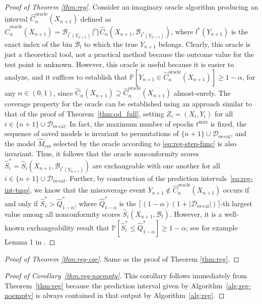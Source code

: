 \begin{proof}[Proof of Theorem \ref{thm:reg}]
Consider an imaginary oracle algorithm producing an interval $\hat{C}^{\text{oracle}}_{\alpha}(X_{n+1})$ defined as $\hat{C}^{\text{oracle}}_{\alpha}(X_{n+1}) = \mathcal{B}_{l^*(Y_{n+1})} \bigcap \hat{C}_{\alpha}(X_{n+1}, \mathcal{B}_{l^*(Y_{n+1})})$, where $l^*(Y_{n+1})$ is the exact index of the bin $\mathcal{B}_l$ to which the true $Y_{n+1}$ belongs. Clearly, this oracle is just a theoretical tool, not a practical method because the outcome value for the test point is unknown.
However, this oracle is useful because it is easier to analyze, and it suffices to establish that $\mathbb{P}[Y_{n+1} \in \hat{C}^{\text{oracle}}_{\alpha}(X_{n+1})] \geq 1-\alpha$, for any $\alpha \in (0,1)$, since $\hat{C}_{\alpha}(X_{n+1}) \supseteq \hat{C}^{\text{oracle}}_{\alpha}(X_{n+1})$ almost-surely.
The coverage property for the oracle can be established using an approach similar to that of the proof of Theorem~\ref{thm:od_full}, setting $Z_i=(X_i,Y_i)$ for all $i \in \{n+1\} \cup \mathcal{D}_{\text{es-cal}}$.
In fact, the maximum number of epochs $t^{\text{max}}$ is fixed, the sequence of saved models is invariant to permutations of $\{n+1\} \cup \mathcal{D}_{\text{es-cal}}$, and the  model $\hat{M}_{\text{ces}}$ selected by the oracle according to \eqref{eq:reg-step-func} is also invariant.
Thus, it follows that the oracle nonconformity scores $\hat{S}_i^* = \hat{S}_i(X_{n+1}, \mathcal{B}_{l^*(Y_{n+1})})$ are exchangeable with one another for all $i \in \{n+1\} \cup \mathcal{D}_{\text{es-cal}}$.
Further, by construction of the prediction intervals~\eqref{eq:reg-int-tmp}, we know that the miscoverage event $Y_{n+1} \not\in \hat{C}^{\text{oracle}}_{\alpha}(X_{n+1})$ occurs if and only if $\hat{S}^*_i > \hat{Q}^*_{1-\alpha}$, where $\hat{Q}^*_{1-\alpha}$ is the $\lceil (1-\alpha)(1+|\mathcal{D}_{\text{es-cal}}|) \rceil$-th largest value among all nonconformity scores $\hat{S}_i(X_{n+1},\mathcal{B}_l)$.
However, it is a well-known exchangeability result that $\mathbb{P}[\hat{S}^*_i \leq \hat{Q}^*_{1-\alpha}] \geq 1-\alpha$; see for example Lemma 1 in \citet{romano2019conformalized}.
\end{proof}


\begin{proof}[Proof of Theorem \ref{thm:reg-cqr}]
Same as the proof of Theorem \ref{thm:reg}.
\end{proof}

\begin{proof}[Proof of Corollary~\ref{thm:reg-noempty}]
This corollary follows immediately from Theorem~\ref{thm:reg} because the prediction interval given by Algorithm~\ref{alg:reg-noempty} is always contained in that output by Algorithm~\ref{alg:reg}.
\end{proof}

